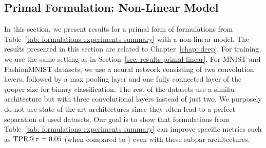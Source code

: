 \subsection{Primal Formulation: Non-Linear Model}\label{sec: results primal nonlinear}

In this section, we present results for a primal form of formulations from Table~\ref{tab: formulations experiments summary} with a non-linear model. The results presented in this section are related to Chapter~\ref{chap: deep}. For training, we use the same setting as in Section~\ref{sec: results primal linear}. For MNIST and FashionMNIST datasets, we use a neural network consisting of two convolution layers, followed by a max pooling layer and one fully connected layer of the proper size for binary classification. The rest of the datasets use a similar architecture but with three convolutional layers instead of just two. We purposely do not use state-of-the-art architectures since they often lead to a perfect separation of used datasets. Our goal is to show that formulations from Table~\ref{tab: formulations experiments summary} can improve specific metrics such as $\operatorname{TPR@}\tau = 0.05$ (when compared to \BaseLine) even with these subpar architectures.

